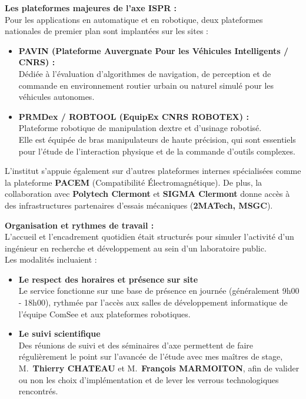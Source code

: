 \documentclass[12pt,a4paper,oneside]{report}
\begin{document}
\bigskip

\textbf{Les plateformes majeures de l'axe ISPR :}\\
\hspace*{1cm} Pour les applications en automatique et en robotique, deux plateformes nationales de premier plan sont implantées sur les sites :
\begin{itemize}[label=\textbullet]
    \item \textbf{PAVIN (Plateforme Auvergnate Pour les Véhicules Intelligents / CNRS) :} \\
    \hspace*{.5cm} Dédiée à l'évaluation d'algorithmes de navigation, de perception et de commande en environnement routier urbain ou naturel simulé pour les véhicules autonomes.
    \item \textbf{PRMDex / ROBTOOL (EquipEx CNRS ROBOTEX) :}\\
    \hspace*{.5cm} Plateforme robotique de manipulation dextre et d'usinage robotisé.\\
    Elle est équipée de bras manipulateurs de haute précision, qui sont essentiels pour l'étude de l'interaction physique et de la commande d'outils complexes.
\end{itemize}

\bigskip

L'institut s'appuie également sur d'autres plateformes internes spécialisées comme la plateforme \textbf{PACEM} (Compatibilité Électromagnétique). De plus, la collaboration avec \textbf{Polytech Clermont} et \textbf{SIGMA Clermont} donne accès à des infrastructures partenaires d'essais mécaniques (\textbf{2MATech, MSGC}).\\

\bigskip
\bigskip

\textbf{Organisation et rythmes de travail :}\\
L'accueil et l'encadrement quotidien était structurés pour simuler l'activité d'un ingénieur en recherche et développement au sein d'un laboratoire public.\\
Les modalités incluaient :
\begin{itemize}[label=\textbullet]
    \item \textbf{Le respect des horaires et présence sur site}\\
    \hspace*{.5cm} Le service fonctionne sur une base de présence en journée (généralement 9h00 - 18h00), rythmée par l'accès aux salles de développement informatique de l'équipe ComSee et aux plateformes robotiques.
    \item \textbf{Le suivi scientifique} \\
    \hspace*{.5cm} Des réunions de suivi et des séminaires d'axe permettent de faire régulièrement le point sur l'avancée de l'étude avec mes maîtres de stage, M.~\textbf{Thierry CHATEAU} et M.~\textbf{François MARMOITON}, afin de valider ou non les choix d'implémentation et de lever les verrous technologiques rencontrés.
\end{itemize}
\end{document}

